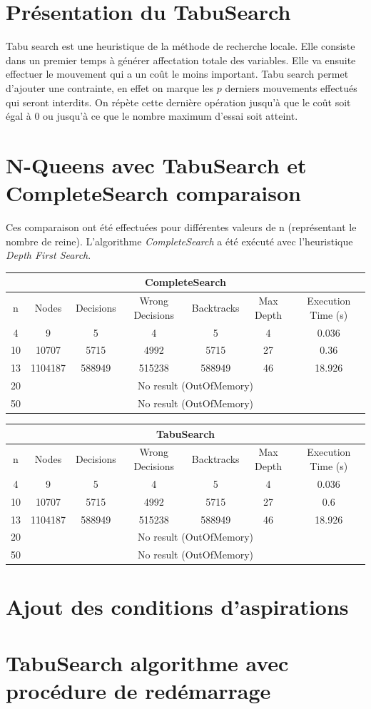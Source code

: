 \documentclass[a4paper,10pt]{article}
\begin{document}
\section{Présentation du TabuSearch}
Tabu search est une heuristique de la méthode de recherche locale. Elle consiste dans un premier temps à générer affectation totale des variables. Elle va ensuite effectuer le mouvement qui a un coût le moins important. Tabu search permet d'ajouter une contrainte, en effet on marque les $p$ derniers mouvements effectués qui seront interdits. On répète cette dernière opération jusqu'à que le coût soit égal à 0 ou jusqu'à ce que le nombre maximum d'essai soit atteint.

\section{N-Queens avec TabuSearch et CompleteSearch comparaison}

Ces comparaison ont été effectuées pour différentes valeurs de n (représentant le nombre de reine). L'algorithme \emph{CompleteSearch} a été exécuté avec l'heuristique \emph{Depth First Search}.
\vspace{0.3cm}

\begin{tabular}{|c|c|c|c|c|c|c|}
\hline
\multicolumn{7}{|c|}{CompleteSearch}\\
\hline
n & Nodes & Decisions & Wrong Decisions & Backtracks & Max Depth & Execution Time (s) \\
\hline
4 & 9 & 5 & 4 & 5 & 4 & 0.036\\
\hline
10 & 10707 & 5715 & 4992 & 5715 & 27 & 0.36\\
\hline
13 & 1104187 & 588949 & 515238 & 588949 & 46 & 18.926\\
\hline
20 & \multicolumn{6}{c|}{No result (OutOfMemory)}\\
\hline
50 & \multicolumn{6}{c|}{No result (OutOfMemory)}\\
\hline
\end{tabular}

\vspace{0.3cm}
\begin{tabular}{|c|c|c|c|c|c|c|}
\hline
\multicolumn{7}{|c|}{TabuSearch}\\
\hline
n & Nodes & Decisions & Wrong Decisions & Backtracks & Max Depth & Execution Time (s) \\
\hline
4 & 9 & 5 & 4 & 5 & 4 & 0.036\\
\hline
10 & 10707 & 5715 & 4992 & 5715 & 27 & 0.6\\
\hline
13 & 1104187 & 588949 & 515238 & 588949 & 46 & 18.926\\
\hline
20 & \multicolumn{6}{c|}{No result (OutOfMemory)}\\
\hline
50 & \multicolumn{6}{c|}{No result (OutOfMemory)}\\
\hline
\end{tabular}

\section{Ajout des conditions d'aspirations}

\section{TabuSearch algorithme avec procédure de redémarrage}
\end{document}
